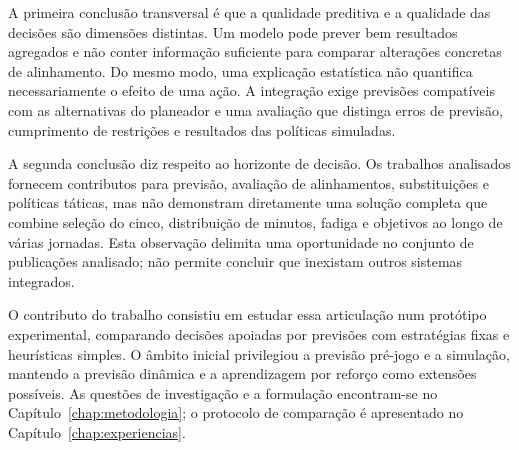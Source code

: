 A primeira conclusão transversal é que a qualidade preditiva e a
qualidade das decisões são dimensões distintas. Um modelo pode prever
bem resultados agregados e não conter informação suficiente para
comparar alterações concretas de alinhamento. Do mesmo modo, uma
explicação estatística não quantifica necessariamente o efeito de uma
ação. A integração exige previsões compatíveis com as alternativas do
planeador e uma avaliação que distinga erros de previsão, cumprimento
de restrições e resultados das políticas simuladas.

A segunda conclusão diz respeito ao horizonte de decisão. Os trabalhos
analisados fornecem contributos para previsão, avaliação de alinhamentos,
substituições e políticas táticas, mas não demonstram diretamente uma
solução completa que combine seleção do cinco, distribuição de minutos,
fadiga e objetivos ao longo de várias jornadas. Esta observação delimita
uma oportunidade no conjunto de publicações analisado; não permite
concluir que inexistam outros sistemas integrados.

O contributo do trabalho consistiu em estudar essa articulação num protótipo
experimental, comparando decisões apoiadas por previsões com estratégias
fixas e heurísticas simples. O âmbito inicial privilegiou a previsão
pré-jogo e a simulação, mantendo a previsão dinâmica e a aprendizagem
por reforço como extensões possíveis. As questões de investigação e a
formulação encontram-se no Capítulo~\ref{chap:metodologia}; o protocolo
de comparação é apresentado no Capítulo~\ref{chap:experiencias}.
